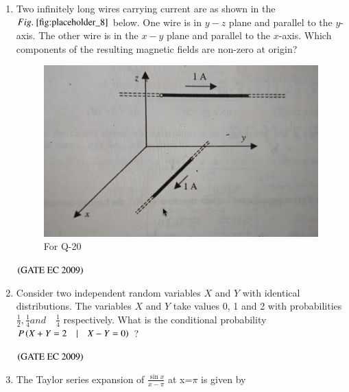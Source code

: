 \documentclass[journal,12pt,onecolumn]{IEEEtran}
\theoremstyle{remark}
\begin{document}
\begin{enumerate}[start=1, label={Q\arabic*.}]
\item Two infinitely long wires carrying current are as shown in the $\figref{fig:placeholder_8}$ below. One wire is in $y-z$ plane and parallel to the $y$-axis. The other wire is in the $x-y$ plane and parallel to the $x$-axis. Which components of the resulting magnetic fields are non-zero at origin?
\begin{figure}[H]
    \centering
    \includegraphics[width=0.5\columnwidth]{figs/img_8.jpg}
    \caption{\centering For Q-20}
    \label{fig:placeholder_8}
\end{figure}
\begin{enumerate}
\end{enumerate}
\hfill $\left(\text{GATE EC 2009}\right)$
\item Consider two independent random variables $X$ and $Y$ with identical distributions. The variables $X$ and $Y$ take values 0, 1 and 2 with probabilities $\frac{1}{2}, \frac{1}{4} and  \quad \frac{1}{4}$ respectively. What is the conditional probability $P\left(X+Y=2 \quad| \quad X-Y=0\right)$ ?

\begin{enumerate}
\end{enumerate}
\hfill $\left(\text{GATE EC 2009}\right)$

\item The Taylor series expansion of $\frac{\sin x}{x-\pi}$ at x=$\pi$ is given by


\end{enumerate}
\end{document}
